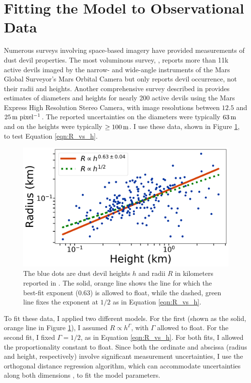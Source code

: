 \documentclass{aastex63}
\begin{document}
\section{Fitting the Model to Observational Data}
\label{sec:fitting}
Numerous surveys involving space-based imagery have provided measurements of dust devil properties. The most voluminous survey, \citet{2006JGRE..11112002C}, reports more than 11k active devils imaged by the narrow- and wide-angle instruments of the Mars Global Surveyor's Mars Orbital Camera but only reports devil occurrence, not their radii and heights. Another comprehensive survey described in \citet{2008Icar..197...39S} provides estimates of diameters and heights for nearly 200 active devils using the Mars Express High Resolution Stereo Camera, with image resolutions between $12.5$ and $25\,{\rm m\ pixel^{-1}}$. The reported uncertainties on the diameters were typically $63\,{\rm m}$ and on the heights were typically $\ge 100\,{\rm m}$. I use these data, shown in Figure \ref{fig:Fit_to_Stanzel_data}, to test Equation \ref{eqn:R_vs_h}.

\begin{figure}
    \centering
    \includegraphics[width=\textwidth]{Fit_to_Stanzel_data.png}
    \caption{The blue dots are dust devil heights $h$ and radii $R$ in kilometers reported in \citet{2008Icar..197...39S}. The solid, orange line shows the line for which the best-fit exponent (0.63) is allowed to float, while the dashed, green line fixes the exponent at $1/2$ as in Equation \ref{eqn:R_vs_h}.}
    \label{fig:Fit_to_Stanzel_data}
\end{figure}

To fit these data, I applied two different models. For the first (shown as the solid, orange line in Figure \ref{fig:Fit_to_Stanzel_data}), I assumed $R \propto h^\Gamma$, with $\Gamma$ allowed to float. For the second fit, I fixed $\Gamma = 1/2$, as in Equation \ref{eqn:R_vs_h}. For both fits, I allowed the proportionality constant to float. Since both the ordinate and abscissa (radius and height, respectively) involve significant measurement uncertainties, I use the orthogonal distance regression algorithm, which can accommodate uncertainties along both dimensions \citep{odrref, scipy}, to fit the model parameters.
\end{document}
